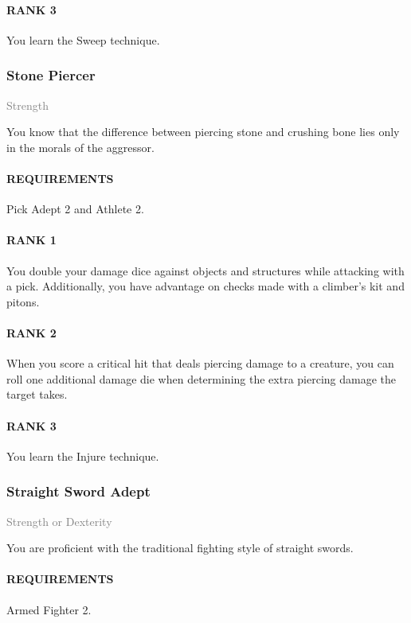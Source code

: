 \paragraph{RANK 3} You learn the Sweep technique.

\subsubsection{Stone Piercer} \label{feat::stonepiercer}
\small{\textcolor{gray}{Strength}}

\normalsize
You know that the difference between piercing stone and crushing bone lies only in the morals of the aggressor.
\paragraph{REQUIREMENTS} Pick Adept 2 and Athlete 2.
\paragraph{RANK 1} You double your damage dice against objects and structures while attacking with a pick.
Additionally, you have advantage on checks made with a climber's kit and pitons.
\paragraph{RANK 2} When you score a critical hit that deals piercing damage to a creature, you can roll one additional damage die when determining the extra piercing damage the target takes.
\paragraph{RANK 3} You learn the Injure technique.

\subsubsection{Straight Sword Adept} \label{feat::straightswordadept}
\small{\textcolor{gray}{Strength or Dexterity}}

\normalsize
You are proficient with the traditional fighting style of straight swords.
\paragraph{REQUIREMENTS} Armed Fighter 2.
